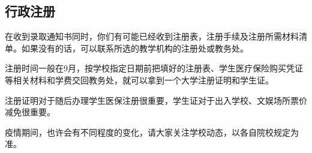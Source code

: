 \subsection{行政注册}

在收到录取通知书同时，你们有可能已经收到注册表，注册手续及注册所需材料清单。如果没有的话，可以联系所选的教学机构的注册处或教务处。

注册时间一般在9月，按学校指定日期前把填好的注册表、学生医疗保险购买凭证等相关材料和学费交回教务处，就可以拿到一个大学注册证明和学生证。

注册证明对于随后办理学生医保注册很重要，学生证对于出入学校、文娱场所票价减免很重要。

疫情期间，也许会有不同程度的变化，请大家关注学校动态，以各自院校规定为准。
